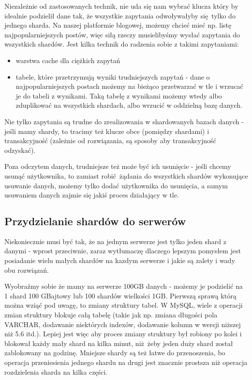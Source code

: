 \documentclass[a4paper,12pt]{article}
\begin{document}
Niezależnie od zastosowanych technik, nie uda się nam wybrać klucza który by idealnie podzielił dane tak, że wszystkie zapytania odwoływałyby się tylko do jednego sharda. Na naszej platformie blogowej, możemy chcieć mieć np. listę najpopularniejszych postów, więc siłą rzeczy musielibyśmy wysłać zapytania do wszystkich shardów. Jest kilka technik do radzenia sobie z takimi zapytaniami:
\begin{itemize}
 \item warstwa cache dla ciężkich zapytań
 \item tabele, które przetrzymują wyniki trudniejszych zapytań - dane o najpopularniejszych postach możemy na bieżąco przetwarzać w tle i wrzucać je do tabeli z wynikami. Taką tabelę z wynikami możemy wtedy albo zduplikować na wszystkich shardach, albo wrzucić w oddzielną bazę danych.
\end{itemize}

Nie tylko zapytania są trudne do zrealizowania w shardowanych bazach danych - jeśli mamy shardy, to tracimy też klucze obce (pomiędzy shardami) i transakcyjność (zależnie od rozwiązania, są sposoby aby transakcyjność odzyskać).

Poza odczytem danych, trudniejsze też może być ich usunięcie - jeśli chcemy usunąć użytkownika, to zamiast robić żądania do wszystkich shardów wykonujące usuwanie danych, możemy tylko dodać użytkownika do usunięcia, a samym usuwaniem danych zajmie się jakiś proces działający w tle.

\subsection{Przydzielanie shardów do serwerów}

Niekoniecznie musi być tak, że na jednym serwerze jest tylko jeden shard z danymi - wprost przeciwnie, zaraz wytłumaczę dlaczego lepszym pomysłem jest posiadanie wielu małych shardów na kazdym serwerze i jakie są zalety i wady obu rozwiązań.

Wyobraźmy sobie że mamy na serwerze 100GB danych - możemy je podzielić na 1 shard 100 GBajtowy lub 100 shardów wielkości 1GB. Pierwszą sprawą którą można wziąć pod uwagę, to zmiany struktury tabel. W MySQL, wiele z operacji zmian struktury blokuje całą tabelę (takie jak np. zmiana długości pola VARCHAR, dodawanie niektórych indexów, dodawanie kolumn w wersji niższej niż 5.6 itd.). Lepiej jest więc aby proces zmiany struktury był robiony po kolei i blokował każdy mały shard na kilka minut, niż żeby jeden duży shard został zablokowany na godzinę. Mniejsze shardy są też łatwe do przenoszenia, bo operacja przeniesienia jednego shardu na drugi jest znacznie prostsza niż operacja rozdzielenia sharda na kilka części.
\end{document}
